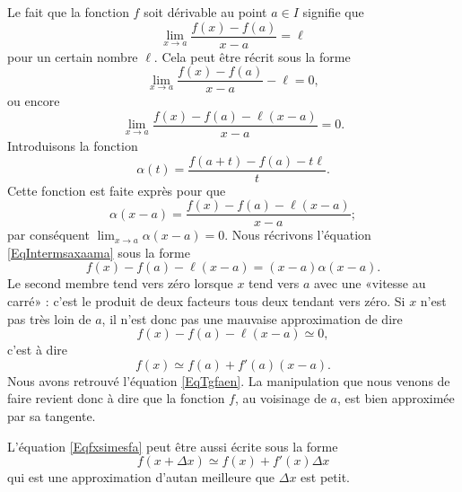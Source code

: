 Le fait que la fonction $f$ soit dérivable au point $a\in I$ signifie que
\begin{equation}
	\lim_{x\to a} \frac{ f(x)-f(a) }{ x-a }=\ell
\end{equation}
pour un certain nombre $\ell$. Cela peut être récrit sous la forme
\begin{equation}
	\lim_{x\to a} \frac{ f(x)-f(a) }{ x-a }-\ell=0,
\end{equation}
ou encore
\begin{equation}
	\lim_{x\to a} \frac{ f(x)-f(a)-\ell(x-a) }{ x-a }=0.
\end{equation}
Introduisons la fonction
\begin{equation}
	\alpha(t)=\frac{ f(a+t)-f(a)-t\ell }{ t }.
\end{equation}
Cette fonction est faite exprès pour que
\begin{equation}		\label{EqIntermsaxaama}
	\alpha(x-a)=\frac{ f(x)-f(a)-\ell(x-a) }{ x-a };
\end{equation}
par conséquent $\lim_{x\to a} \alpha(x-a)=0$. Nous récrivons l'équation \eqref{EqIntermsaxaama} sous la forme
\begin{equation}        \label{EqCodeDerviffxam}
	f(x)-f(a)-\ell(x-a)=(x-a)\alpha(x-a).
\end{equation}
Le second membre tend vers zéro lorsque $x$ tend vers $a$ avec une «vitesse au carré» : c'est le produit de deux facteurs tous deux tendant vers zéro. Si $x$ n'est pas très loin de $a$, il n'est donc pas une mauvaise approximation de dire
\begin{equation}
	f(x)-f(a)-\ell(x-a)\simeq 0,
\end{equation}
c'est à dire
\begin{equation}		\label{Eqfxsimesfa}
	f(x)\simeq f(a)+f'(a)(x-a).
\end{equation}
Nous avons retrouvé l'équation \eqref{EqTgfaen}. La manipulation que nous venons de faire revient donc à dire que la fonction $f$, au voisinage de $a$, est bien approximée par sa tangente.

L'équation \eqref{Eqfxsimesfa} peut être aussi écrite sous la forme
\begin{equation}		\label{EqfxdxSimeqfxfpx}
	f(x+\Delta x)\simeq f(x)+f'(x)\Delta x
\end{equation}
qui est une approximation d'autan meilleure que $\Delta x$ est petit.

